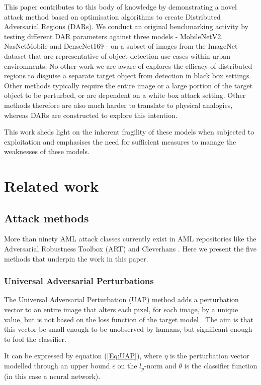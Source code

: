 \documentclass{article}
\begin{document}
This paper contributes to this body of knowledge by demonstrating a novel attack method based on optimisation algorithms to create Distributed Adversarial Regions (DARs). We conduct an original benchmarking activity by testing different DAR parameters against three models - MobileNetV2, NasNetMobile and DenseNet169 - on a subset of images from the ImageNet dataset that are representative of object detection use cases within urban environments. No other work we are aware of explores the efficacy of distributed regions to disguise a separate target object from detection in black box settings. Other methods typically require the entire image or a large portion of the target object to be perturbed, or are dependent on a white box attack setting. Other methods therefore are also much harder to translate to physical analogies, whereas DARs are constructed to explore this intention.  

This work sheds light on the inherent fragility of these models when subjected to exploitation and emphasises the need for sufficient measures to manage the weaknesses of these models.

\section{Related work}

\subsection{Attack methods}

More than ninety AML attack classes currently exist in AML repositories like the Adversarial Robustness Toolbox (ART) and Cleverhans \cite{noauthor_adversarial_2021, noauthor_cleverhans_2021}. Here we present the five methods that underpin the work in this paper. 

\subsubsection{Universal Adversarial Perturbations}
 
The Universal Adversarial Perturbation (UAP) method adds a perturbation vector to an entire image that alters each pixel, for each image, by a unique value, but is not based on the loss function of the target model \cite{biggio_wild_2018}. The aim is that this vector be small enough to be unobserved by humans, but significant enough to fool the classifier. 

It can be expressed by equation 
(\ref{Eq:UAP}), where $\eta$ is the perturbation vector modelled through an upper bound $\epsilon$ on the $l_{p}$-norm and $\theta$ is the classifier function (in this case a neural network).
\end{document}
